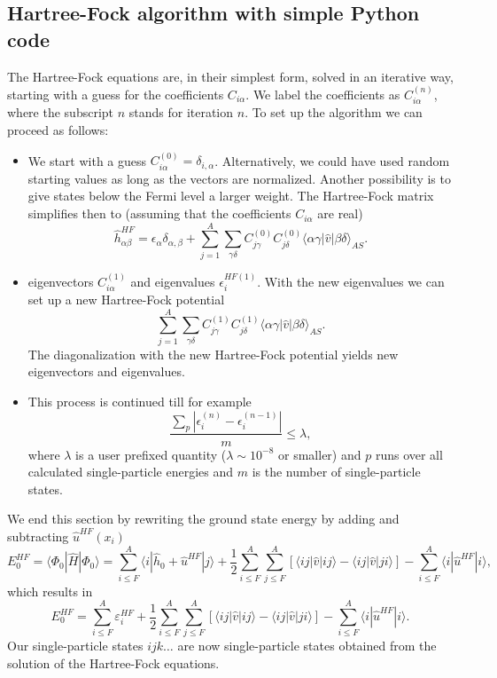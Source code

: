 \subsection{Hartree-Fock algorithm with simple Python code}
The Hartree-Fock equations are, in their simplest form, solved in an
iterative way, starting with a guess for the coefficients
$C_{i\alpha}$. We label the coefficients as $C_{i\alpha}^{(n)}$, where
the subscript $n$ stands for iteration $n$.  To set up the algorithm
we can proceed as follows:
\begin{itemize}
\item We start with a guess
$C_{i\alpha}^{(0)}=\delta_{i,\alpha}$. Alternatively, we could have
used random starting values as long as the vectors are
normalized. Another possibility is to give states below the Fermi
level a larger weight.  The Hartree-Fock matrix simplifies then to
(assuming that the coefficients $C_{i\alpha} $ are real)
\[
\hat{h}_{\alpha\beta}^{HF}=\epsilon_{\alpha}\delta_{\alpha,\beta}+
\sum_{j = 1}^A\sum_{\gamma\delta} C_{j\gamma}^{(0)}C_{j\delta}^{(0)}\langle \alpha\gamma|\hat{v}|\beta\delta\rangle_{AS}.
\]

\item
eigenvectors $C_{i\alpha}^{(1)}$ and eigenvalues $\epsilon_i^{HF(1)}$.
With the new eigenvalues we can set up a new Hartree-Fock potential
\[
\sum_{j = 1}^A\sum_{\gamma\delta} C_{j\gamma}^{(1)}C_{j\delta}^{(1)}\langle \alpha\gamma|\hat{v}|\beta\delta\rangle_{AS}.
\]
The diagonalization with the new Hartree-Fock potential yields new
eigenvectors and eigenvalues.  
\item This process is continued till for
example
\[
\frac{\sum_{p} |\epsilon_i^{(n)}-\epsilon_i^{(n-1)}|}{m} \le \lambda,  
\]
where $\lambda$ is a user prefixed quantity ($\lambda \sim 10^{-8}$ or
smaller) and $p$ runs over all calculated single-particle energies and
$m$ is the number of single-particle states.
\end{itemize}




We end this section by rewriting the ground state energy by adding and subtracting
$\hat{u}^{HF}(x_i)$
\[
  E_0^{HF} =\langle \Phi_0 | \hat{H} | \Phi_0\rangle = 
\sum_{i\le F}^A \langle i | \hat{h}_0 +\hat{u}^{HF}| j\rangle+ \frac{1}{2}\sum_{i\le F}^A\sum_{j \le F}^A\left[\langle ij |\hat{v}|ij \rangle-\langle ij|\hat{v}|ji\rangle\right]-\sum_{i\le F}^A \langle i |\hat{u}^{HF}| i\rangle,
\]
which results in
\[
  E_0^{HF}
  = \sum_{i\le F}^A \varepsilon_i^{HF} + \frac{1}{2}\sum_{i\le F}^A\sum_{j \le F}^A\left[\langle ij |\hat{v}|ij \rangle-\langle ij|\hat{v}|ji\rangle\right]-\sum_{i\le F}^A \langle i |\hat{u}^{HF}| i\rangle.
\]
Our single-particle states $ijk\dots$ are now single-particle states
obtained from the solution of the Hartree-Fock equations.



